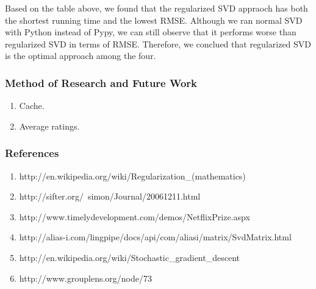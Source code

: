 \documentclass[12pt]{article}
\begin{document}
\noindent Based on the table above, we found that the regularized SVD appraoch has both the shortest running time and the lowest RMSE. Although we ran normal SVD with Python instead of Pypy, we can still observe that it performs worse than regularized SVD in terms of RMSE. Therefore, we conclued that regularized SVD is the optimal approach among the four.


\subsubsection*{Method of Research and Future Work}
\begin{enumerate}
\item Cache.
\item Average ratings.
\end{enumerate}

\subsubsection*{References}
\begin{enumerate}
  \item http://en.wikipedia.org/wiki/Regularization\_(mathematics)
  \item http://sifter.org/~simon/Journal/20061211.html
  \item http://www.timelydevelopment.com/demos/NetflixPrize.aspx
  \item http://alias-i.com/lingpipe/docs/api/com/aliasi/matrix/SvdMatrix.html
  \item http://en.wikipedia.org/wiki/Stochastic\_gradient\_descent
  \item http://www.grouplens.org/node/73
\end{enumerate}
\end{document}
